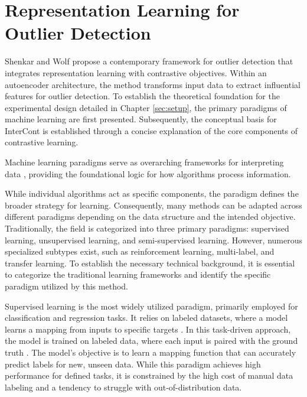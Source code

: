 \section{Representation Learning for Outlier Detection}\label{sec:representation_learning}
Shenkar and Wolf propose a contemporary framework for outlier detection that integrates representation learning with contrastive objectives. 
Within an autoencoder architecture, the method transforms input data to extract influential features for outlier detection. 
To establish the theoretical foundation for the experimental design detailed in Chapter \ref{sec:setup}, the primary paradigms of machine learning are first presented. 
Subsequently, the conceptual basis for InterCont is established through a concise explanation of the core components of contrastive learning.

\begin{sloppypar} Machine learning paradigms serve as overarching frameworks for interpreting data \citep[p. 4]{sarker2021machine}, providing the foundational logic for how algorithms process information. \end{sloppypar}
While individual algorithms act as specific components, the paradigm defines the broader strategy for learning. 
Consequently, many methods can be adapted across different paradigms depending on the data structure and the intended objective. 
Traditionally, the field is categorized into three primary paradigms: supervised learning, unsupervised learning, and semi-supervised learning. 
However, numerous specialized subtypes exist, such as reinforcement learning, multi-label, and transfer learning.
To establish the necessary technical background, it is essential to categorize the traditional learning frameworks and identify the specific paradigm utilized by this method. 


Supervised learning is the most widely utilized paradigm, primarily employed for classification and regression tasks. 
It relies on labeled datasets, where a model learns a mapping from inputs to specific targets \citep{lecun2015deep}. 
In this task-driven approach, the model is trained on labeled data, where each input is paired with the ground truth \citep[p.3]{sarker2021machine}. 
The model's objective is to learn a mapping function that can accurately predict labels for new, unseen data. 
While this paradigm achieves high performance for defined tasks, it is constrained by the high cost of manual data labeling and a tendency to struggle with out-of-distribution data. 



